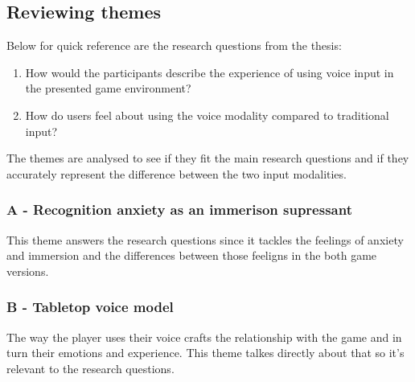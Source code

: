 \subsection{Reviewing themes}




Below for quick reference are the research questions from the thesis: 

\begin{enumerate}
    \item How would the participants describe the experience of using voice input in the presented
game environment?
    \item How do users feel about using the voice modality compared to traditional input?
\end{enumerate}

The themes are analysed to see if they fit the main research questions and if they accurately represent the difference between the two input modalities.


\subsubsection{A - Recognition anxiety as an immerison supressant}


This theme answers the research questions since it tackles the feelings of anxiety and immersion and the differences between those feeligns in the both game versions.


\subsubsection{B - Tabletop voice model}

The way the player uses their voice crafts the relationship with the game and in turn their emotions and experience. This theme talkes directly about that so it's relevant to the research questions.


